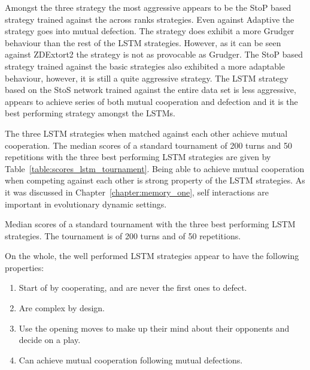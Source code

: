 Amongst the three strategy the most aggressive appears to be the StoP based
strategy trained against the across ranks strategies. Even against Adaptive the
strategy goes into mutual defection. The strategy does exhibit a more Grudger
behaviour than the rest of the LSTM strategies. However, as it can be seen
against ZDExtort2 the strategy is not as provocable as Grudger. The StoP based
strategy trained against the basic strategies also exhibited a more adaptable
behaviour, however, it is still a quite aggressive strategy. The
LSTM strategy based on the StoS network trained against the entire data set is
less aggressive, appears to achieve series of both mutual cooperation and
defection and it is the best performing strategy amongst the LSTMs.

The three LSTM strategies when matched against each other achieve mutual
cooperation. The median scores of a standard tournament of 200 turns and 50
repetitions with the three best performing LSTM strategies are given by
Table~\ref{table:scores_lstm_tournament}. Being able to achieve mutual
cooperation when competing against each other is strong property of the LSTM
strategies. As it was discussed in Chapter~\ref{chapter:memory_one}, self
interactions are important in evolutionary dynamic settings.

\begin{table}[!htbp]
    \begin{center}
    \resizebox{\textwidth}{!}{
        
    }
\end{center}
\caption{Median scores of a standard tournament with the three best performing
LSTM strategies. The tournament is of 200 turns and of 50
repetitions.}\label{table:scores_lstm_tournament}
\end{table}

On the whole, the well performed LSTM strategies appear to have the following
properties:

\begin{enumerate}
    \item Start of by cooperating, and are never the first ones to defect.
    \item Are complex by design.
    \item Use the opening moves to make up their mind about their opponents and decide on a play.
    \item Can achieve mutual cooperation following mutual defections.
\end{enumerate}

